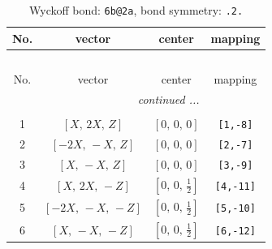 \documentclass[fleqn,8pt]{jsarticle}
\begin{document}
\begin{longtable}{cccc}
\caption{Wyckoff bond: {\tt 6b@2a}, bond symmetry: {\tt .2.}}
 \\
 \hline \hline
No. & vector & center & mapping \\ \hline \endfirsthead

\multicolumn{3}{l}{\tablename\ \thetable{}} \\
 \hline \hline
No. & vector & center & mapping \\ \hline \endhead

 \hline \hline
\multicolumn{3}{r}{\footnotesize\it continued ...} \\ \endfoot

 \hline \hline
\multicolumn{3}{r}{} \\ \endlastfoot

1 & $\left[ X,\, 2 X,\, Z \right]$ & $\left[ 0,\, 0,\, 0 \right]$ & {\tt [1,-8]} \\ \hline
2 & $\left[ - 2 X,\, - X,\, Z \right]$ & $\left[ 0,\, 0,\, 0 \right]$ & {\tt [2,-7]} \\ \hline
3 & $\left[ X,\, - X,\, Z \right]$ & $\left[ 0,\, 0,\, 0 \right]$ & {\tt [3,-9]} \\ \hline
4 & $\left[ X,\, 2 X,\, - Z \right]$ & $\left[ 0,\, 0,\, \frac{1}{2} \right]$ & {\tt [4,-11]} \\ \hline
5 & $\left[ - 2 X,\, - X,\, - Z \right]$ & $\left[ 0,\, 0,\, \frac{1}{2} \right]$ & {\tt [5,-10]} \\ \hline
6 & $\left[ X,\, - X,\, - Z \right]$ & $\left[ 0,\, 0,\, \frac{1}{2} \right]$ & {\tt [6,-12]} \\
\end{longtable}
\renewcommand{\arraystretch}{1.2}
\end{document}
